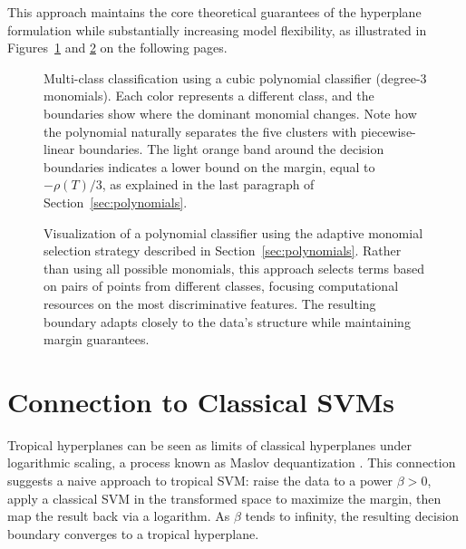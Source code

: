 \documentclass{article}
\begin{document}
This approach maintains the core theoretical guarantees of the hyperplane formulation while substantially increasing model flexibility, as illustrated in Figures~\ref{fig:homogeneous_selection} and \ref{fig:adaptive_polynomial} on the following pages.

\newpage

\vspace*{3em}
\begin{figure}[ht!]
    \centering
    \resizebox{0.8\textwidth}{!}{\clipbox{0.15\width{} 0.30\height{} 0.15\width{} 0.30\height{}}{}}
    \caption{Multi-class classification using a cubic polynomial classifier (degree-3 monomials). Each color represents a different class, and the boundaries show where the dominant monomial changes. Note how the polynomial naturally separates the five clusters with piecewise-linear boundaries. The light orange band around the decision boundaries indicates a lower bound on the margin, equal to $-\rho(T)/3$, as explained in the last paragraph of Section~\ref{sec:polynomials}.}
    \label{fig:homogeneous_selection}
\end{figure}
\vspace*{4em}
\begin{figure}[ht!]
    \centering
    \resizebox{0.8\textwidth}{!}{\clipbox{0.15\width{} 0.30\height{} 0.15\width{} 0.30\height{}}{}}
    \caption{Visualization of a polynomial classifier using the adaptive monomial selection strategy described in Section~\ref{sec:polynomials}. Rather than using all possible monomials, this approach selects terms based on pairs of points from different classes, focusing computational resources on the most discriminative features. The resulting boundary adapts closely to the data's structure while maintaining margin guarantees.}
    \label{fig:adaptive_polynomial}
\end{figure}
\vspace*{3em}


\newpage
\section{Connection to Classical SVMs}\label{sec:maslov}
Tropical hyperplanes can be seen as limits of classical hyperplanes under logarithmic scaling, a process known as Maslov dequantization \cite{viro2001}. This connection suggests a naive approach to tropical SVM: raise the data to a power $\beta > 0$, apply a classical SVM in the transformed space to maximize the margin, then map the result back via a logarithm. As $\beta$ tends to infinity, the resulting decision boundary converges to a tropical hyperplane.
\end{document}

